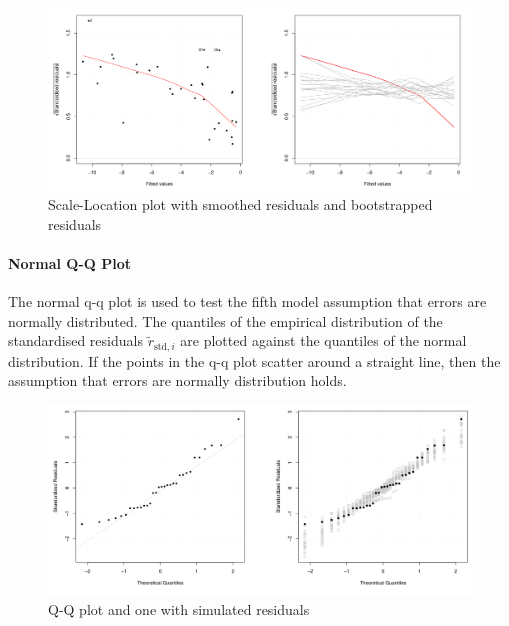 \documentclass[11pt]{article}
\theoremstyle{definition}
\begin{document}
\begin{figure}[H]
	\centering
	\includegraphics[width=0.8\linewidth]{img/scale_location_plot}
	\caption{Scale-Location plot with smoothed residuals and bootstrapped residuals}
	\label{fig:scalelocationplot}
\end{figure}


\paragraph{Normal Q-Q Plot}
The normal q-q plot is used to test the fifth model assumption that errors are normally distributed. The quantiles of the empirical distribution of the standardised residuals $\tilde{r}_{\text{std},i}$ are plotted against the quantiles of the normal distribution. If the points in the q-q plot scatter around a straight line, then the assumption that errors are normally distribution holds.

\begin{figure}[H]
	\centering
	\includegraphics[width=0.8\linewidth]{img/q-q_plot}
	\caption{Q-Q plot and one with simulated residuals}
	\label{fig:q-qplot}
\end{figure}
\end{document}

